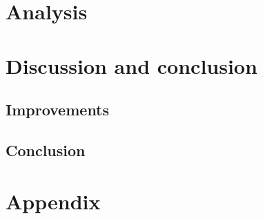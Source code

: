 
\section{Analysis}

\section{Discussion and conclusion}


\subsection{Improvements}

\subsection{Conclusion}

\section{Appendix}

